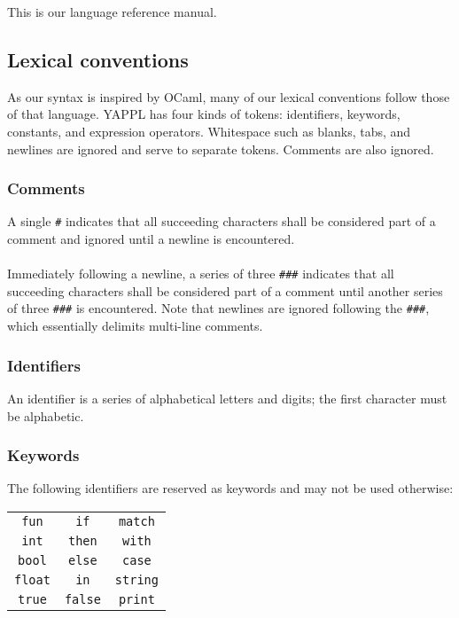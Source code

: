 This is our language reference manual. 

\subsection{Lexical conventions}

As our syntax is inspired by OCaml, many of our lexical conventions follow those of that language. YAPPL has four kinds of tokens: identifiers, keywords, constants, and expression operators. Whitespace such as blanks, tabs, and newlines are ignored and serve to separate tokens. Comments are also ignored.

\subsubsection{Comments}

A single \texttt{\#} indicates that all succeeding characters shall be considered part of a comment and ignored until a newline is encountered. \\
\\
Immediately following a newline, a series of three \texttt{\#\#\#} indicates that all succeeding characters shall be considered part of a comment until another series of three \texttt{\#\#\#} is encountered. Note that newlines are ignored following the \texttt{\#\#\#}, which essentially delimits multi-line comments.

\subsubsection{Identifiers}

An identifier is a series of alphabetical letters and digits; the first character must be alphabetic. 

\subsubsection{Keywords}

The following identifiers are reserved as keywords and may not be used otherwise:
\begin{table}[htdp]
\center
\begin{tabular}{c c c}
\texttt{fun} & \texttt{if} &\texttt{match} \\
\texttt{int} & \texttt{then} & \texttt{with} \\
\texttt{bool} & \texttt{else} &\texttt{case} \\
\texttt{float} & \texttt{in} & \texttt{string} \\
\texttt{true} & \texttt{false} & \texttt{print} \\
\end{tabular}
\label{default}
\end{table}%



